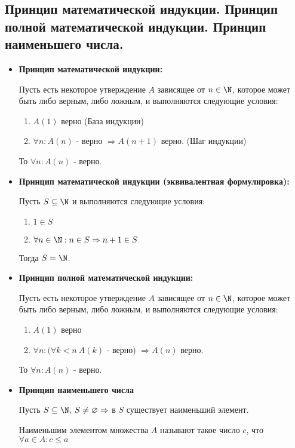 \subsection{Принцип математической индукции. Принцип полной математической индукции. Принцип наименьшего числа.}{
	\begin{itemize}
		\item \textbf{Принцип математической индукции:}
		
		Пусть есть некоторое утверждение $A$ зависящее от $n \in \N$, которое может быть либо верным, либо ложным, и выполняются следующие условия:
		\begin{enumerate}
			\item $A(1)$ верно (База индукции)
			\item $\forall n : A(n)$ - верно $\Rightarrow A(n + 1)$ верно. (Шаг индукции)
		\end{enumerate}
		То $\forall n : A(n)$ - верно.
		
		\item \textbf{Принцип математической индукции (эквивалентная формулировка):}
		
		Пусть $S \subseteq \N$ и выполняются следующие условия:
		\begin{enumerate}
			\item $1 \in S$
			\item $\forall n \in \N : n \in S \Rightarrow n + 1 \in S$
		\end{enumerate}
		Тогда $S = \N$.
		
		\item \textbf{Принцип полной математической индукции:}
		
		Пусть есть некоторое утверждение $A$ зависящее от $n \in \N$, которое может быть либо верным, либо ложным, и выполняются следующие условия:
		\begin{enumerate}
			\item $A(1)$ верно
			\item $\forall n : (\forall k < n \: A(k)$ - верно) $\Rightarrow A(n)$ верно.
		\end{enumerate}
		То $\forall n : A(n)$ - верно.
		
		\item \textbf{Принцип наименьшего числа}
		
		Пусть $S \subseteq \N, \: S \neq \varnothing \Rightarrow$ в $S$ существует наименьший элемент.
		
		Наименьшим элементом множества $A$ называют такое число $c$, что $\forall a \in A : c \leqslant a$
		
	\end{itemize}
}